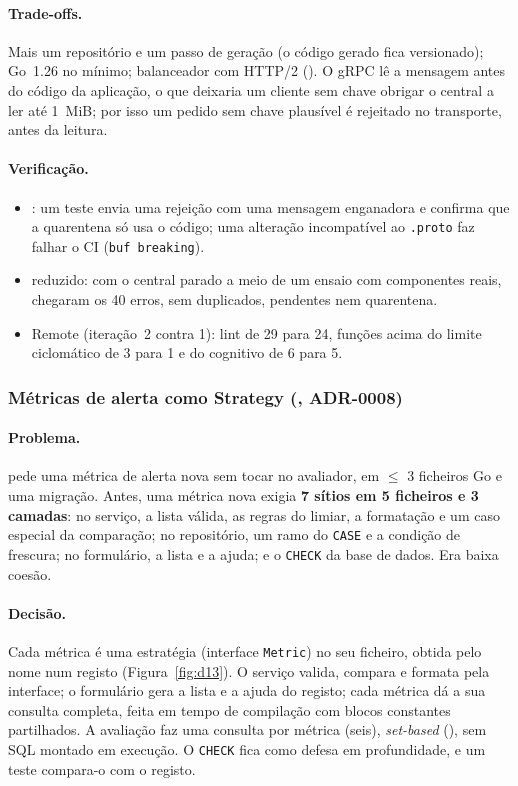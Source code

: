 \paragraph{Trade-offs.}
Mais um repositório e um passo de geração (o código gerado fica versionado); Go~1.26 no mínimo; balanceador com
HTTP/2 (). O gRPC lê a mensagem antes do código da aplicação, o que deixaria um cliente sem chave obrigar o
central a ler até 1~MiB; por isso um pedido sem chave plausível é rejeitado no transporte, antes da leitura.

\paragraph{Verificação.}
\begin{itemize}
  \item {}: um teste envia uma rejeição com uma mensagem enganadora e confirma que a quarentena só usa o
        código; uma alteração incompatível ao \texttt{.proto} faz falhar o CI (\texttt{buf breaking}).
  \item {} reduzido: com o central parado a meio de um ensaio com componentes reais, chegaram os 40 erros,
        sem duplicados, pendentes nem quarentena.
  \item Remote (iteração~2 contra 1): lint de 29 para 24, funções acima do limite ciclomático de 3 para 1 e do
        cognitivo de 6 para 5.
\end{itemize}

\subsubsection{Métricas de alerta como Strategy (, ADR-0008)}
\label{sec:d13}

\paragraph{Problema.}
 pede uma métrica de alerta nova sem tocar no avaliador, em $\le$ 3 ficheiros Go e uma migração. Antes,
uma métrica nova exigia \textbf{7 sítios em 5 ficheiros e 3 camadas}: no serviço, a lista válida, as regras do
limiar, a formatação e um caso especial da comparação; no repositório, um ramo do \texttt{CASE} e a condição de
frescura; no formulário, a lista e a ajuda; e o \texttt{CHECK} da base de dados. Era baixa coesão.

\paragraph{Decisão.}
Cada métrica é uma estratégia (interface \texttt{Metric}) no seu ficheiro, obtida pelo nome num registo
(Figura~\ref{fig:d13}). O serviço valida, compara e formata pela interface; o formulário gera a lista e a ajuda do
registo; cada métrica dá a sua consulta completa, feita em tempo de compilação com blocos constantes partilhados.
A avaliação faz uma consulta por métrica (seis), \emph{set-based} (), sem SQL montado em execução. O
\texttt{CHECK} fica como defesa em profundidade, e um teste compara-o com o registo.

